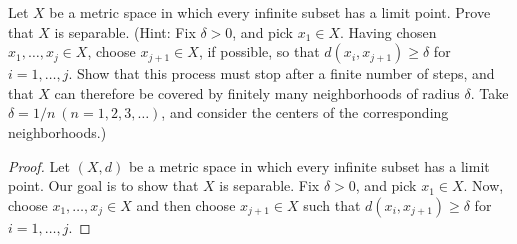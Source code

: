 \documentclass[a4paper]{article}
\begin{document}
   \begin{problem}
      Let \( X  \) be a metric space in which every infinite subset has a limit point. Prove that \( X  \) is separable. (Hint: Fix \( \delta > 0  \), and pick \( {x}_{1} \in X  \). Having chosen \( {x}_{1}, \dots, {x}_{j} \in X  \), choose \( {x}_{j+1} \in X  \), if possible, so that \( d({x}_{i}, {x}_{j+1}) \geq \delta \) for \( i = 1,\dots, j \). Show that this process must stop after a finite number of steps, and that \( X  \) can therefore be covered by finitely many neighborhoods of radius \( \delta  \). Take \( \delta = 1/n \ (n = 1,2,3,\dots) \), and consider the centers of the corresponding neighborhoods.)
   \end{problem}
   \begin{proof}
   Let \( (X,d) \) be a metric space in which every infinite subset has a limit point. Our goal is to show that \( X  \) is separable. Fix \( \delta > 0  \), and pick \( {x}_{1} \in X  \). Now, choose \( {x}_{1}, \dots, {x}_{j } \in X  \) and then choose \( {x}_{j+1} \in X  \) such that \( d({x}_{i}, {x}_{j+1}) \geq \delta \) for \( i = 1, \dots, j  \).
   \end{proof}
\end{document}
